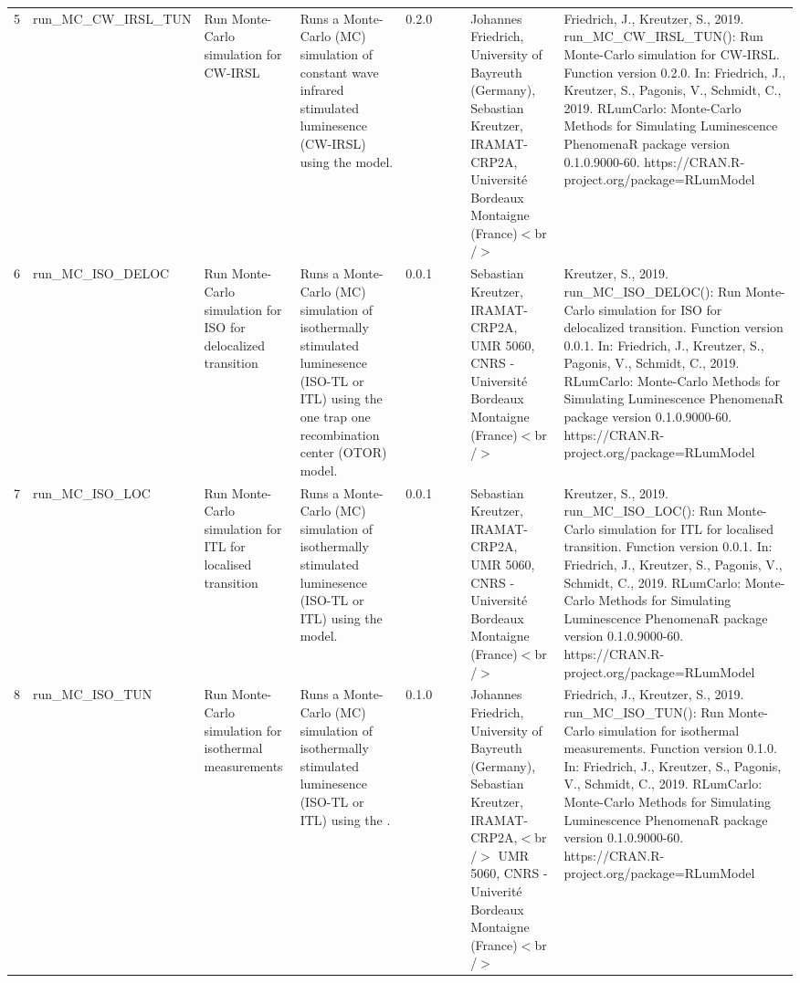 \begin{table}[ht]
\begin{tabular}{rllllllll}
 \\ 
  5 & run\_MC\_CW\_IRSL\_TUN & Run Monte-Carlo simulation for CW-IRSL & Runs a Monte-Carlo (MC) simulation of constant wave infrared stimulated luminesence (CW-IRSL) using the model. & 0.2.0
 &  &  & Johannes Friedrich, University of Bayreuth (Germany), Sebastian Kreutzer, IRAMAT-CRP2A, Université Bordeaux Montaigne (France)$<$br /$>$ & Friedrich, J., Kreutzer, S., 2019. run\_MC\_CW\_IRSL\_TUN(): Run Monte-Carlo simulation for CW-IRSL. Function version 0.2.0. In: Friedrich, J., Kreutzer, S., Pagonis, V., Schmidt, C., 2019. RLumCarlo: Monte-Carlo Methods for Simulating Luminescence PhenomenaR package version 0.1.0.9000-60. https://CRAN.R-project.org/package=RLumModel
 \\ 
  6 & run\_MC\_ISO\_DELOC & Run Monte-Carlo simulation for ISO for delocalized transition & Runs a Monte-Carlo (MC) simulation of isothermally stimulated luminesence (ISO-TL or ITL) using the one trap one recombination center (OTOR) model. & 0.0.1
 &  &  & Sebastian Kreutzer, IRAMAT-CRP2A, UMR 5060, CNRS - Université Bordeaux Montaigne (France)$<$br /$>$ & Kreutzer, S., 2019. run\_MC\_ISO\_DELOC(): Run Monte-Carlo simulation for ISO for delocalized transition. Function version 0.0.1. In: Friedrich, J., Kreutzer, S., Pagonis, V., Schmidt, C., 2019. RLumCarlo: Monte-Carlo Methods for Simulating Luminescence PhenomenaR package version 0.1.0.9000-60. https://CRAN.R-project.org/package=RLumModel
 \\ 
  7 & run\_MC\_ISO\_LOC & Run Monte-Carlo simulation for ITL for localised transition & Runs a Monte-Carlo (MC) simulation of isothermally stimulated luminesence (ISO-TL or ITL) using the model. & 0.0.1
 &  &  & Sebastian Kreutzer, IRAMAT-CRP2A, UMR 5060, CNRS - Université Bordeaux Montaigne (France)$<$br /$>$ & Kreutzer, S., 2019. run\_MC\_ISO\_LOC(): Run Monte-Carlo simulation for ITL for localised transition. Function version 0.0.1. In: Friedrich, J., Kreutzer, S., Pagonis, V., Schmidt, C., 2019. RLumCarlo: Monte-Carlo Methods for Simulating Luminescence PhenomenaR package version 0.1.0.9000-60. https://CRAN.R-project.org/package=RLumModel
 \\ 
  8 & run\_MC\_ISO\_TUN & Run Monte-Carlo simulation for isothermal measurements & Runs a Monte-Carlo (MC) simulation of isothermally stimulated luminesence (ISO-TL or ITL) using the . & 0.1.0
 &  &  & Johannes Friedrich, University of Bayreuth (Germany), Sebastian Kreutzer, IRAMAT-CRP2A,$<$br /$>$ UMR 5060, CNRS - Univerité Bordeaux Montaigne (France)$<$br /$>$ & Friedrich, J., Kreutzer, S., 2019. run\_MC\_ISO\_TUN(): Run Monte-Carlo simulation for isothermal measurements. Function version 0.1.0. In: Friedrich, J., Kreutzer, S., Pagonis, V., Schmidt, C., 2019. RLumCarlo: Monte-Carlo Methods for Simulating Luminescence PhenomenaR package version 0.1.0.9000-60. https://CRAN.R-project.org/package=RLumModel

\end{tabular}
\end{table}
